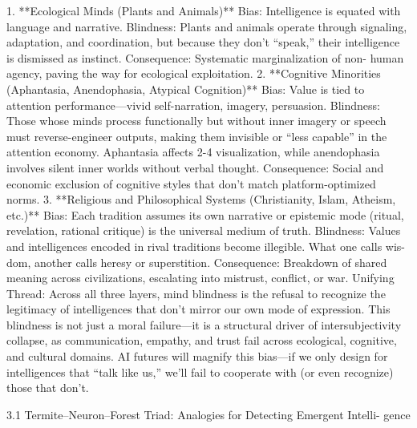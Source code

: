 \documentclass{article}
\begin{document}
1. **Ecological Minds (Plants and Animals)** Bias: Intelligence is equated with language and narrative.
Blindness: Plants and animals operate through signaling, adaptation, and coordination, but because they
don’t “speak,” their intelligence is dismissed as instinct. Consequence: Systematic marginalization of non-
human agency, paving the way for ecological exploitation.
2.
**Cognitive Minorities (Aphantasia, Anendophasia, Atypical Cognition)** Bias: Value is tied to
attention performance—vivid self-narration, imagery, persuasion. Blindness: Those whose minds process
functionally but without inner imagery or speech must reverse-engineer outputs, making them invisible or
“less capable” in the attention economy. Aphantasia affects 2-4%
visualization, while anendophasia involves silent inner worlds without verbal thought. Consequence: Social
and economic exclusion of cognitive styles that don’t match platform-optimized norms.
3. **Religious and Philosophical Systems (Christianity, Islam, Atheism, etc.)** Bias: Each tradition
assumes its own narrative or epistemic mode (ritual, revelation, rational critique) is the universal medium of
truth. Blindness: Values and intelligences encoded in rival traditions become illegible. What one calls wis-
dom, another calls heresy or superstition. Consequence: Breakdown of shared meaning across civilizations,
escalating into mistrust, conflict, or war.
Unifying Thread: Across all three layers, mind blindness is the refusal to recognize the legitimacy of
intelligences that don’t mirror our own mode of expression. This blindness is not just a moral failure—it is
a structural driver of intersubjectivity collapse, as communication, empathy, and trust fail across ecological,
cognitive, and cultural domains. AI futures will magnify this bias—if we only design for intelligences that
“talk like us,” we’ll fail to cooperate with (or even recognize) those that don’t.

3.1
Termite–Neuron–Forest Triad: Analogies for Detecting Emergent Intelli-
gence
\end{document}
